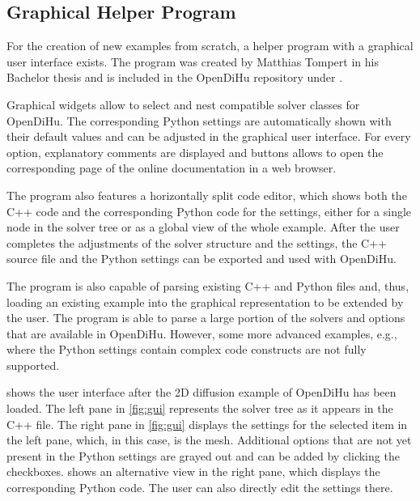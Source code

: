 \subsection{Graphical Helper Program}
For the creation of new examples from scratch, a helper program with a graphical user interface exists. The program was created by Matthias Tompert in his Bachelor thesis and is included in the OpenDiHu repository under .

Graphical widgets allow to select and nest compatible solver classes for OpenDiHu. The corresponding Python settings are automatically shown with their default values and can be adjusted in the graphical user interface. For every option, explanatory comments are displayed and buttons allows to open the corresponding page of the online documentation in a web browser.

The program also features a horizontally split code editor, which shows both the C++ code and the corresponding Python code for the settings, either for a single node in the solver tree or as a global view of the whole example. 
After the user completes the adjustments of the solver structure and the settings, the C++ source file and the Python settings can be exported and used with OpenDiHu.

The program is also capable of parsing existing C++ and Python files and, thus, loading an existing example into the graphical representation to be extended by the user. The program is able to parse a large portion of the solvers and options that are available in OpenDiHu. However, some more advanced examples, e.g., where the Python settings contain complex code constructs are not fully supported.

 shows the user interface after the 2D diffusion example of OpenDiHu has been loaded. The left pane in \cref{fig:gui} represents the solver tree as it appears in the C++ file. The right pane in \cref{fig:gui} displays the settings for the selected item in the left pane, which, in this case, is the mesh. Additional options that are not yet present in the Python settings are grayed out and can be added by clicking the checkboxes.
 shows an alternative view in the right pane, which displays the corresponding Python code. The user can also directly edit the settings there.


